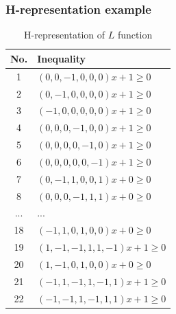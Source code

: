 \documentclass{beamer}
\begin{document}
\begin{frame}
    \frametitle{H-representation example}
\begin{table}[h]
\footnotesize
\centering
\begin{tabular}{|c|l|}
\hline
\textbf{No.} & \textbf{Inequality} \\ \hline
1  & $(0, 0, -1, 0, 0, 0) x + 1 \geq 0$ \\ \hline
2  & $(0, -1, 0, 0, 0, 0) x + 1 \geq 0$ \\ \hline
3  & $(-1, 0, 0, 0, 0, 0) x + 1 \geq 0$ \\ \hline
4  & $(0, 0, 0, -1, 0, 0) x + 1 \geq 0$ \\ \hline
5  & $(0, 0, 0, 0, -1, 0) x + 1 \geq 0$ \\ \hline
6  & $(0, 0, 0, 0, 0, -1) x + 1 \geq 0$ \\ \hline
7  & $(0, -1, 1, 0, 0, 1) x + 0 \geq 0$ \\ \hline
8  & $(0, 0, 0, -1, 1, 1) x + 0 \geq 0$ \\ \hline
... & ... \\ \hline
18 & $(-1, 1, 0, 1, 0, 0) x + 0 \geq 0$ \\ \hline
19 & $(1, -1, -1, 1, 1, -1) x + 1 \geq 0$ \\ \hline
20 & $(1, -1, 0, 1, 0, 0) x + 0 \geq 0$ \\ \hline
21 & $(-1, 1, -1, 1, -1, 1) x + 1 \geq 0$ \\ \hline
22 & $(-1, -1, 1, -1, 1, 1) x + 1 \geq 0$ \\ \hline
\end{tabular}
\caption{H-representation of $L$ function}
\label{tab:h-repineq}
\end{table}
    
\end{frame}
\end{document}
